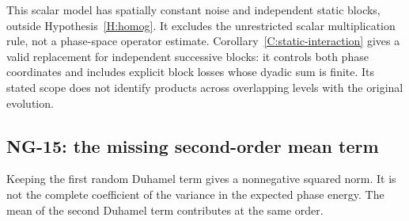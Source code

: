 

This scalar model has spatially constant noise and independent static
blocks, outside Hypothesis~\ref{H:homog}. It excludes the unrestricted
scalar multiplication rule, not a phase-space operator estimate. Corollary~\ref{C:static-interaction} gives a valid replacement for independent
successive blocks: it controls both phase coordinates and includes explicit
block losses whose dyadic sum is finite. Its stated scope does not identify
products across overlapping levels with the original evolution.

\subsection{NG-15: the missing second-order mean term}\label{S:nogo-15}

Keeping the first random Duhamel term gives a nonnegative squared norm.
It is not the complete coefficient of the variance in the expected phase
energy. The mean of the second Duhamel term contributes at the same order.


